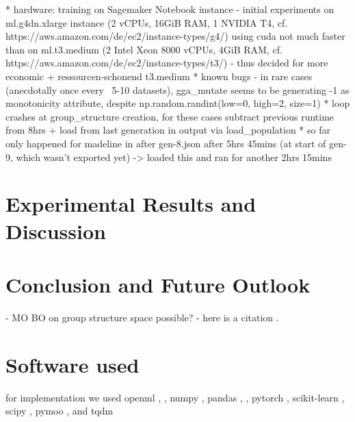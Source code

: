 \documentclass[twoside,11pt]{article}
\begin{document}
  * hardware: training on Sagemaker Notebook instance
    - initial experiments on ml.g4dn.xlarge instance (2 vCPUs, 16GiB RAM, 1 NVIDIA T4, cf. https://aws.amazon.com/de/ec2/instance-types/g4/)
    using cuda not much faster than on ml.t3.medium (2 Intel Xeon 8000 vCPUs, 4GiB RAM, cf. https://aws.amazon.com/de/ec2/instance-types/t3/)
    - thus decided for more economic + ressourcen-schonend t3.medium
  * known bugs
    - in rare cases (anecdotally once every ~5-10 datasets), gga\_mutate seems to be generating -1 as monotonicity attribute, despite np.random.randint(low=0, high=2, size=1)
      * loop crashes at group\_structure creation, for these cases subtract previous runtime from 8hrs + load from last generation in output via load\_population
      * so far only happened for madeline in after gen-8.json after 5hrs 45mins (at start of gen-9, which wasn't exported yet) -> loaded this and ran for another 2hrs 15mins


\section{Experimental Results and Discussion}


\section{Conclusion and Future Outlook}
- MO BO on group structure space possible?
- here is a citation \cite{EAGGA}.


\newpage

\appendix
\section{Software used}
for implementation we used
openml \cite{OpenML}, \cite{OpenMLPython},
numpy \cite{numpy},
pandas \cite{pandas1}, \cite{pandas2},
pytorch \cite{PyTorch},
scikit-learn \cite{scikit-learn},
scipy \cite{SciPy},
pymoo \cite{pymoo}, and
tqdm \cite{tqdm}

\section{}
\label{app:theorem}

\end{document}
